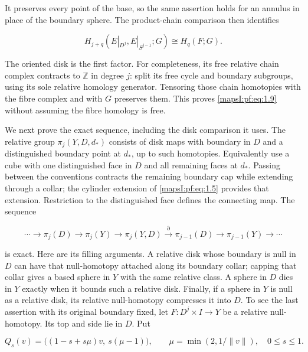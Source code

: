 It preserves every point of the base, so the same assertion holds for an annulus in place of the boundary sphere. The product-chain comparison then identifies

\begin{equation}
H_{j+q}(E|_{D^j},E|_{S^{j-1}};G)\cong H_q(F;G).
\label{mapsI:pf:eq:1.9}
\end{equation}

The oriented disk is the first factor. For completeness, its free relative chain complex contracts to \(\mathbb Z\) in degree \(j\): split its free cycle and boundary subgroups, using its sole relative homology generator. Tensoring those chain homotopies with the fibre complex and with \(G\) preserves them. This proves \eqref{mapsI:pf:eq:1.9} without assuming the fibre homology is free.

We next prove the exact sequence, including the disk comparison it uses. The relative group \(\pi_j(Y,D,d_*)\) consists of disk maps with boundary in \(D\) and a distinguished boundary point at \(d_*\), up to such homotopies. Equivalently use a cube with one distinguished face in \(D\) and all remaining faces at \(d_*\). Passing between the conventions contracts the remaining boundary cap while extending through a collar; the cylinder extension of \eqref{mapsI:pf:eq:1.5} provides that extension. Restriction to the distinguished face defines the connecting map. The sequence

\begin{equation}
\cdots\to\pi_j(D)\to\pi_j(Y)\to\pi_j(Y,D)
\xrightarrow{\partial}\pi_{j-1}(D)\to\pi_{j-1}(Y)\to\cdots
\label{mapsI:pf:eq:1.10}
\end{equation}

is exact. Here are its filling arguments. A relative disk whose boundary is null in \(D\) can have that null-homotopy attached along its boundary collar; capping that collar gives a based sphere in \(Y\) with the same relative class. A sphere in \(D\) dies in \(Y\) exactly when it bounds such a relative disk. Finally, if a sphere in \(Y\) is null as a relative disk, its relative null-homotopy compresses it into \(D\). To see the last assertion with its original boundary fixed, let \(F:D^j\times I\to Y\) be a relative null-homotopy. Its top and side lie in \(D\). Put

\begin{equation}
Q_s(v)=\bigl((1-s+s\mu)v,\ s(\mu-1)\bigr),
\qquad \mu=\min(2,1/\|v\|),\quad0\leq s\leq1.
\label{mapsI:pf:eq:1.11}
\end{equation}

